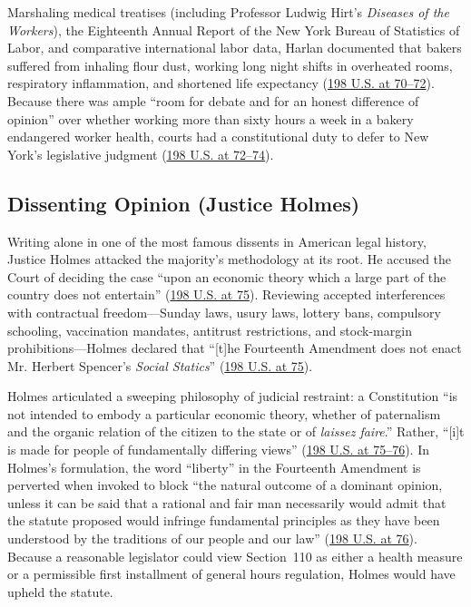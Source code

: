 \documentclass[12pt]{article}
\begin{document}
Marshaling medical treatises (including Professor Ludwig Hirt's \textit{Diseases of the Workers}), the Eighteenth Annual Report of the New York Bureau of Statistics of Labor, and comparative international labor data, Harlan documented that bakers suffered from inhaling flour dust, working long night shifts in overheated rooms, respiratory inflammation, and shortened life expectancy (\href{https://caselaw.findlaw.com/court/us-supreme-court/198/45.html}{198 U.S. at 70--72}). Because there was ample ``room for debate and for an honest difference of opinion'' over whether working more than sixty hours a week in a bakery endangered worker health, courts had a constitutional duty to defer to New York's legislative judgment (\href{https://caselaw.findlaw.com/court/us-supreme-court/198/45.html}{198 U.S. at 72--74}).

\subsection{Dissenting Opinion (Justice Holmes)}

Writing alone in one of the most famous dissents in American legal history, Justice Holmes attacked the majority's methodology at its root. He accused the Court of deciding the case ``upon an economic theory which a large part of the country does not entertain'' (\href{https://caselaw.findlaw.com/court/us-supreme-court/198/45.html}{198 U.S. at 75}). Reviewing accepted interferences with contractual freedom---Sunday laws, usury laws, lottery bans, compulsory schooling, vaccination mandates, antitrust restrictions, and stock-margin prohibitions---Holmes declared that ``[t]he Fourteenth Amendment does not enact Mr. Herbert Spencer's \textit{Social Statics}'' (\href{https://supreme.justia.com/cases/federal/us/198/45/}{198 U.S. at 75}).

Holmes articulated a sweeping philosophy of judicial restraint: a Constitution ``is not intended to embody a particular economic theory, whether of paternalism and the organic relation of the citizen to the state or of \textit{laissez faire}.'' Rather, ``[i]t is made for people of fundamentally differing views'' (\href{https://caselaw.findlaw.com/court/us-supreme-court/198/45.html}{198 U.S. at 75--76}). In Holmes's formulation, the word ``liberty'' in the Fourteenth Amendment is perverted when invoked to block ``the natural outcome of a dominant opinion, unless it can be said that a rational and fair man necessarily would admit that the statute proposed would infringe fundamental principles as they have been understood by the traditions of our people and our law'' (\href{https://caselaw.findlaw.com/court/us-supreme-court/198/45.html}{198 U.S. at 76}). Because a reasonable legislator could view Section~110 as either a health measure or a permissible first installment of general hours regulation, Holmes would have upheld the statute.
\end{document}
